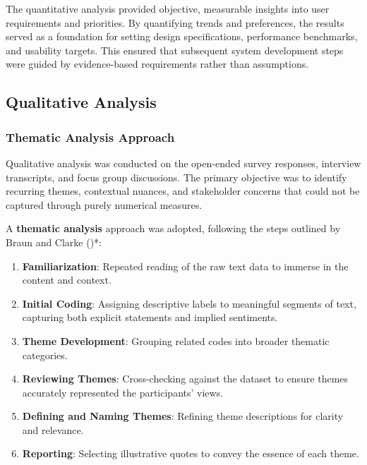 \documentclass[
  12pt,
  oneside]{article}
\providecommand{\tightlist}{%
  \setlength{\itemsep}{0pt}\setlength{\parskip}{0pt}}
\begin{document}
The quantitative analysis provided objective, measurable insights into
user requirements and priorities. By quantifying trends and preferences,
the results served as a foundation for setting design specifications,
performance benchmarks, and usability targets. This ensured that
subsequent system development steps were guided by evidence-based
requirements rather than assumptions.

\subsection{Qualitative Analysis}\label{qualitative-analysis}

\subsubsection{Thematic Analysis
Approach}\label{thematic-analysis-approach}

Qualitative analysis was conducted on the open-ended survey responses,
interview transcripts, and focus group discussions. The primary
objective was to identify recurring themes, contextual nuances, and
stakeholder concerns that could not be captured through purely numerical
measures.

A \textbf{thematic analysis} approach was adopted, following the steps
outlined by Braun and Clarke ()*:

\begin{enumerate}
\def\labelenumi{\arabic{enumi}.}
\tightlist
\item
  \textbf{Familiarization}: Repeated reading of the raw text data to
  immerse in the content and context.
\item
  \textbf{Initial Coding}: Assigning descriptive labels to meaningful
  segments of text, capturing both explicit statements and implied
  sentiments.
\item
  \textbf{Theme Development}: Grouping related codes into broader
  thematic categories.
\item
  \textbf{Reviewing Themes}: Cross-checking against the dataset to
  ensure themes accurately represented the participants' views.
\item
  \textbf{Defining and Naming Themes}: Refining theme descriptions for
  clarity and relevance.
\item
  \textbf{Reporting}: Selecting illustrative quotes to convey the
  essence of each theme.
\end{enumerate}
\end{document}
